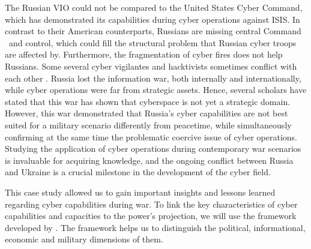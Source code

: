 The Russian VIO could not be compared to the United States Cyber Command, which has demonstrated its capabilities during cyber operations against ISIS. In contrast to their American counterparts, Russians are missing central Command \ and control, which could fill the structural problem that Russian cyber troops are affected by. Furthermore, the fragmentation of cyber fires does not help Russians. Some several cyber vigilantes and hacktivists sometimes conflict with each other \autocite{cyberpeaceinstitute_2023_cyber}. Russia lost the information war, both internally and internationally, while cyber operations were far from strategic assets. Hence, several scholars have stated that this war has shown that cyberspace is not yet a strategic domain. However, this war demonstrated that Russia’s cyber capabilities are not best suited for a military scenario differently from peacetime, while simultaneously confirming at the same time the problematic coercive issue of cyber operations. Studying the application of cyber operations during contemporary war scenarios is invaluable for acquiring knowledge, and the ongoing conflict between Russia and Ukraine is a crucial milestone in the development of the cyber field.

 
This case study allowed us to gain important insights and lessons learned regarding cyber capabilities during war. To link the key characteristics of cyber capabilities and capacities to the power’s projection, we will use the framework developed by \textcite{vanhaaster_2016_assessing}. The framework helps us to distinguish the political, informational, economic and military dimensions of them. 

